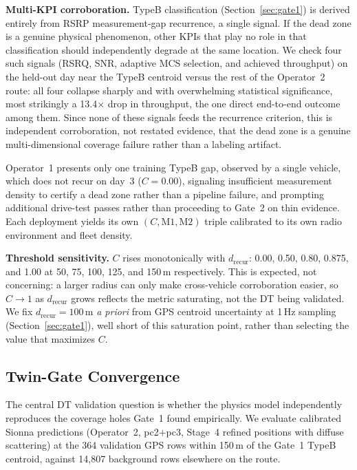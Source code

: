 \documentclass[conference]{IEEEtran}
\begin{document}
\textbf{Multi-KPI corroboration.}
TypeB classification (Section~\ref{sec:gate1}) is derived entirely from
RSRP measurement-gap recurrence, a single signal.
If the dead zone is a genuine physical phenomenon, other KPIs that play
no role in that classification should independently degrade at the same
location.
We check four such signals (RSRQ, SNR, adaptive MCS selection, and
achieved throughput) on the held-out day near the TypeB centroid versus
the rest of the Operator~2 route: all four collapse sharply and with
overwhelming statistical significance, most strikingly a 13.4$\times$
drop in throughput, the one direct end-to-end outcome among them.
Since none of these signals feeds the recurrence criterion, this is
independent corroboration, not restated evidence, that the dead zone is
a genuine multi-dimensional coverage failure rather than a labeling
artifact.

Operator~1 presents only one training TypeB gap, observed by a single
vehicle, which does not recur on day~3 ($C=0.00$), signaling
insufficient measurement density to certify a dead zone rather than a
pipeline failure, and prompting additional drive-test passes rather
than proceeding to Gate~2 on thin evidence. Each deployment yields its
own $(C,\text{M1},\text{M2})$ triple calibrated to its own radio
environment and fleet density.

\textbf{Threshold sensitivity.}
$C$ rises monotonically with $d_\text{recur}$: 0.00, 0.50, 0.80, 0.875,
and 1.00 at 50, 75, 100, 125, and 150\,m respectively. This is expected,
not concerning: a larger radius can only make cross-vehicle corroboration
easier, so $C\to1$ as $d_\text{recur}$ grows reflects the metric
saturating, not the DT being validated. We fix $d_\text{recur}=100$\,m
\emph{a priori} from GPS centroid uncertainty at 1\,Hz sampling
(Section~\ref{sec:gate1}), well short of this saturation point, rather
than selecting the value that maximizes $C$.

\subsection{Twin-Gate Convergence}
\label{sec:convergence_result}

The central DT validation question is whether the physics model
independently reproduces the coverage holes Gate~1 found empirically.
We evaluate calibrated Sionna predictions (Operator~2, pc2$+$pc3,
Stage~4 refined positions with diffuse scattering) at the 364
validation GPS rows within 150\,m of the Gate~1 TypeB centroid, against
14,807 background rows elsewhere on the route.
\end{document}

